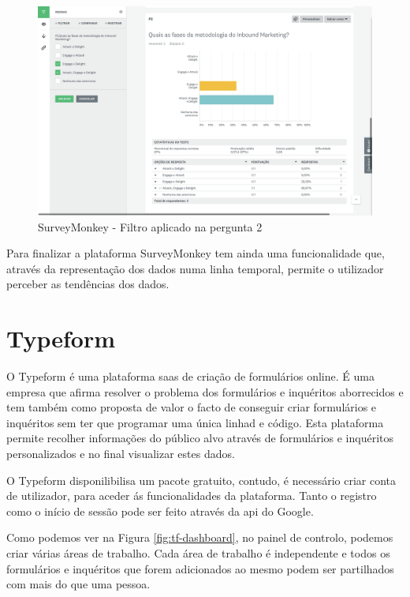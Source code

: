 \begin{figure}[ht!]
	\begin{center}
		\includegraphics[width=1\textwidth]{img/sm/surveymonkey-form-filtro1}
		\caption{SurveyMonkey - Filtro aplicado na pergunta 2 }
		\label{fig:surveymonkey-form-filtro1}
	\end{center}
\end{figure}

Para finalizar a plataforma SurveyMonkey tem ainda uma funcionalidade que, através da representação dos dados numa linha temporal, permite o utilizador perceber as tendências dos dados.

\section{Typeform}
\label{typeform}

O Typeform é uma plataforma \acrshort{saas} de criação de formulários online. É uma empresa que afirma resolver o problema dos formulários e inquéritos aborrecidos e tem também como proposta de valor o facto de conseguir criar formulários e inquéritos sem ter que programar uma única linhad e código. Esta plataforma permite recolher informações do público alvo através de formulários e inquéritos personalizados e no final visualizar estes dados. 

O Typeform disponilibilisa um pacote gratuito, contudo, é necessário criar conta de utilizador, para aceder ás funcionalidades da plataforma. Tanto o registro como o início de sessão pode ser feito através da \acrfull{api} do Google.

Como podemos ver na Figura \ref{fig:tf-dashboard}, no painel de controlo, podemos criar várias áreas de trabalho. Cada área de trabalho é independente e todos os formulários e inquéritos que forem adicionados ao mesmo podem ser partilhados com mais do que uma pessoa.

